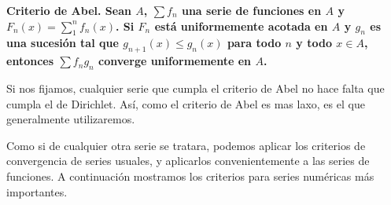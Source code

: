 \documentclass[a4paper]{article}
\begin{document}
\textbf{Criterio de Abel. Sean $A$, $\sum f_n$ una serie de funciones en $A$ y $F_n(x) = \sum_1^n f_n(x)$. Si $F_n$ está uniformemente acotada en $A$ y $g_n$ es una sucesión tal que  $g_{n+1}(x) \le g_{n}(x)$ para todo $n$ y todo $x\in A$, entonces $\sum f_ng_n$ converge uniformemente en $A$.}

Si nos fijamos, cualquier serie que cumpla el criterio de Abel no hace falta que cumpla el de Dirichlet. Así, como el criterio de Abel es mas laxo, es el que generalmente utilizaremos.

\hrulefill

Como si de cualquier otra serie se tratara, podemos aplicar los criterios de convergencia de series usuales, y aplicarlos convenientemente a las series de funciones. A continuación mostramos los criterios para series numéricas más importantes.
\end{document}
